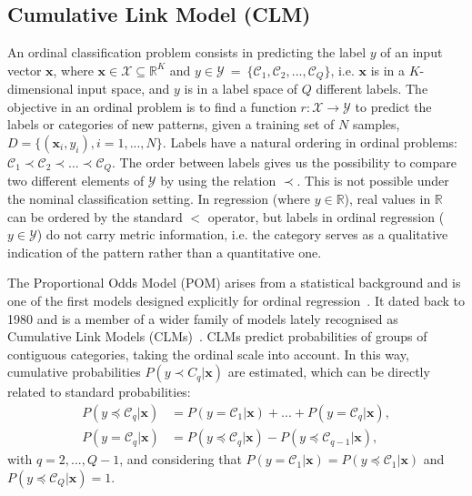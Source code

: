 \documentclass[journal]{IEEEtran}
\begin{document}
	\subsection{Cumulative Link Model (CLM)}
	\label{sect:ordinalproblem}
	An ordinal classification problem consists in predicting the label $y$ of an input vector $\mathbf{x}$, where $\mathbf{x} \in \mathcal{X} \subseteq \mathds{R}^K$ and $y \in \mathcal{Y}~=~\{\mathcal{C}_1, \mathcal{C}_2, ..., \mathcal{C}_Q\}$, i.e. $\mathbf{x}$ is in a $K$-dimensional input space, and $y$ is in a label space of $Q$ different labels. The objective in an ordinal problem is to find a function $r : \mathcal{X} \rightarrow \mathcal{Y}$ to predict the labels or categories of new patterns, given a training set of $N$ samples, $D = \{(\mathbf{x}_i, y_i), i = 1, ..., N\}$. Labels have a natural ordering in ordinal problems: $\mathcal{C}_1 \prec \mathcal{C}_2 \prec ... \prec \mathcal{C}_Q$. The order between labels gives us the possibility to compare two different elements of $\mathcal{Y}$ by using the relation $\prec$. This is not possible under the nominal classification setting. In regression (where $y \in \mathds{R}$), real values in $\mathds{R}$ can be ordered by the standard $<$ operator, but labels in ordinal regression ($y \in \mathcal{Y}$) do not carry metric information, i.e. the category serves as a qualitative indication of the pattern rather than a quantitative one.
	
	The Proportional Odds Model (POM) arises from a statistical background and is one of the first models designed explicitly for ordinal regression~\cite{mccullagh1980regression}. It dated back to 1980 and is a member of a wider family of models lately recognised as Cumulative Link Models (CLMs)~\cite{agresti2010analysis}. CLMs predict probabilities of groups of contiguous categories, taking the ordinal scale into account. In this way, cumulative probabilities $P(y \prec C_q |\mathbf{x})$ are estimated, which can be directly related to standard probabilities:
	\begin{align}
		\nonumber P(y \preceq \mathcal{C}_q | \mathbf{x}) &= P(y = \mathcal{C}_1 | \mathbf{x}) + ... + P(y = \mathcal{C}_q | \mathbf{x}),\\
		\nonumber P(y = \mathcal{C}_q | \mathbf{x}) &= P(y \preceq \mathcal{C}_q | \mathbf{x}) - P(y \preceq \mathcal{C}_{q-1} | \mathbf{x}),
	\end{align}
	with $q = 2, ..., Q-1$, and considering that $P(y = \mathcal{C}_1 | \mathbf{x}) = P(y \preceq \mathcal{C}_1 | \mathbf{x})$ and $P(y \preceq \mathcal{C}_Q | \mathbf{x}) = 1$.
	
\end{document}
